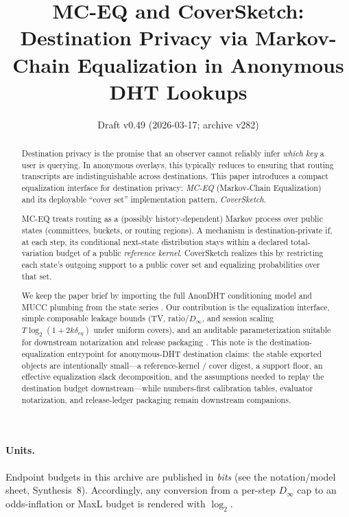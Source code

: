 \documentclass[11pt]{article}
\title{MC-EQ and CoverSketch:\\
Destination Privacy via Markov-Chain Equalization in Anonymous DHT Lookups}
\author{}
\date{Draft v0.49 (2026-03-17; archive v282)}
\begin{document}
\maketitle

\begin{abstract}
Destination privacy is the promise that an observer cannot reliably infer \emph{which key} a user is querying.
In anonymous overlays, this typically reduces to ensuring that routing transcripts are indistinguishable across destinations.
This paper introduces a compact equalization interface for destination privacy: \emph{MC-EQ} (Markov-Chain Equalization) and its deployable ``cover set'' implementation pattern, \emph{CoverSketch}.

MC-EQ treats routing as a (possibly history-dependent) Markov process over public states (committees, buckets, or routing regions).
A mechanism is destination-private if, at each step, its conditional next-state distribution stays within a declared total-variation budget of a public \emph{reference kernel}.
CoverSketch realizes this by restricting each state's outgoing support to a public cover set and equalizing probabilities over that set.

We keep the paper brief by importing the full AnonDHT conditioning model and MUCC plumbing from the state series \cite{series:state2}.
Our contribution is the equalization interface, simple composable leakage bounds (TV, ratio/$D_\infty$, and session scaling $T\log_2(1+2k\delta_{eq})$ under uniform covers), and an auditable parameterization suitable for downstream notarization and release packaging \cite{series:release}.
This note is the destination-equalization entrypoint for anonymous-DHT destination claims: the stable exported objects are intentionally small---a reference-kernel / cover digest, a support floor, an effective equalization slack decomposition, and the assumptions needed to replay the destination budget downstream---while numbers-first calibration tables, evaluator notarization, and release-ledger packaging remain downstream companions.\cite{series:eval3,series:eval1,series:release}
\end{abstract}

\paragraph{Units.}
Endpoint budgets in this archive are published in \emph{bits} (see the notation/model sheet, Synthesis~8).\cite{series:notation}
Accordingly, any conversion from a per-step $D_\infty$ cap to an odds-inflation or MaxL budget is rendered with $\log_2$.
\end{document}
